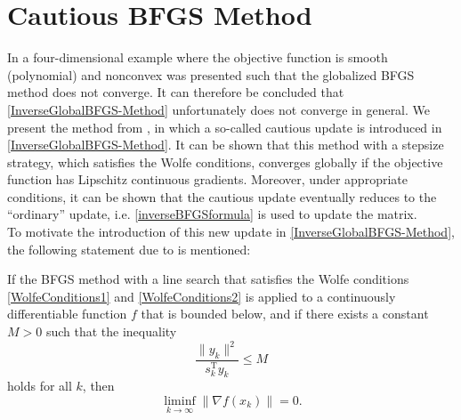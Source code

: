 \section{Cautious BFGS Method}
\label{Section2.5}

In \cite{Dai:2012} a four-dimensional example where the objective function is smooth (polynomial) and nonconvex was presented such that the globalized BFGS method does not converge. It can therefore be concluded that \cref{InverseGlobalBFGS-Method} unfortunately does not converge in general. We present the method from \cite{LiFukushima:2001}, in which a so-called cautious update is introduced in \cref{InverseGlobalBFGS-Method}. It can be shown that this method with a stepsize strategy, which satisfies the Wolfe conditions, converges globally if the objective function has Lipschitz continuous gradients. Moreover, under appropriate conditions, it can be shown that the cautious update eventually reduces to the “ordinary” update, i.e. \cref{inverseBFGSformula} is used to update the matrix. \\
To motivate the introduction of this new update in \cref{InverseGlobalBFGS-Method}, the following statement due to \cite{Powell:1975} is mentioned:

\begin{lemma}
    If the BFGS method with a line search that satisfies the Wolfe conditions \cref{WolfeConditions1} and \cref{WolfeConditions2} is applied to a continuously differentiable function $f$ that is bounded below, and if there exists a constant $M > 0$ such that the inequality
    \begin{equation}\label{CautiousMotivation}
        \frac{\lVert y_k \rVert^2}{s^{\mathrm{T}}_k y_k} \leq M
    \end{equation}
    holds for all $k$, then
    \begin{equation}\label{CautiousLimInf}
        \liminf_{k \to \infty} \lVert \nabla f(x_k) \rVert = 0.
    \end{equation}
\end{lemma}

